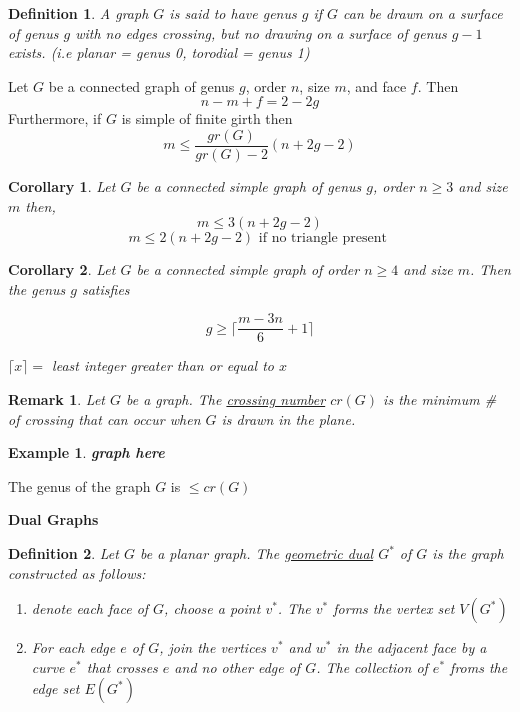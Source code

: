 \documentclass[12pt]{article}
\newenvironment{theorem}[1]{%
  \renewcommand\themanualtheoreminner{#1}%
  \manualtheoreminner
}{\endmanualtheoreminner}
\newtheorem*{corollary}{Corollary}
\newtheorem{example}{Example}
\newtheorem{definition}{Definition}
\newtheorem*{remark}{Remark}
\begin{document}
\begin{definition}
A graph $G$ is said to have genus $g$ if $G$ can be drawn on a surface of genus $g$ with no edges crossing, but no drawing on a surface of genus $g-1$ exists. (i.e planar = genus 0, torodial = genus 1)
\end{definition}



\begin{theorem}{8}
  Let $G$ be a connected graph of genus $g$, order $n$, size $m$, and face $f$. Then
  \[n - m + f = 2-2g\]
  Furthermore, if $G$ is simple of finite girth then
  \[m \le \frac{gr(G)}{gr(G) - 2} (n + 2g - 2)\]
\end{theorem}

\begin{corollary}
  Let $G$ be a connected simple graph of genus $g$, order $n\ge 3$ and size $m$ then,
  \[m \le 3(n+2g-2) \]
  \[m \le 2(n+2g-2) \text{ if no triangle present }\]
\end{corollary}


\begin{corollary}
  Let $G$ be a connected simple graph of order $n\ge 4$ and size $m$. Then the genus $g$ satisfies

  \[g \ge \lceil \frac{m-3n}{6} + 1 \rceil\]

  $\lceil x \rceil =$ least integer greater than or equal to $x$
\end{corollary}

\begin{remark}
  Let $G$ be a graph. The \underline{crossing number} $cr(G)$ is the minimum \# of crossing that can occur when $G$ is drawn in the plane.
\end{remark}

\begin{example}
\textbf{graph here}
\end{example}


\begin{theorem}{9}
The genus of the graph $G$ is $\le cr(G)$
\end{theorem}


\textbf{Dual Graphs}

\begin{definition}
  Let $G$ be a planar graph. The \underline{geometric dual} $G^{*}$ of $G$ is the graph constructed as follows:
  \begin{enumerate}
    \item denote each face of $G$, choose a point $v^{*}$. The $v^{*}$ forms the vertex set $V(G^{*})$
    \item For each edge $e$ of $G$, join the vertices $v^{*}$ and $w^{*}$ in the adjacent face by a curve $e^{*}$ that crosses $e$ and no other edge of $G$. The collection of $e^{*}$ froms the edge set $E(G^{*})$
  \end{enumerate}

\end{definition}
\end{document}
